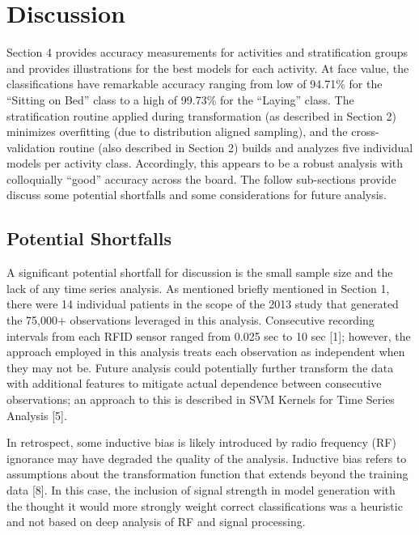 \documentclass[
]{article}
\begin{document}
\newpage

\section{Discussion}\label{discussion}

Section 4 provides accuracy measurements for activities and
stratification groups and provides illustrations for the best models for
each activity. At face value, the classifications have remarkable
accuracy ranging from low of 94.71\% for the ``Sitting on Bed'' class to
a high of 99.73\% for the ``Laying'' class. The stratification routine
applied during transformation (as described in Section 2) minimizes
overfitting (due to distribution aligned sampling), and the
cross-validation routine (also described in Section 2) builds and
analyzes five individual models per activity class. Accordingly, this
appears to be a robust analysis with colloquially ``good'' accuracy
across the board. The follow sub-sections provide discuss some potential
shortfalls and some considerations for future analysis.

\subsection{Potential Shortfalls}\label{potential-shortfalls}

A significant potential shortfall for discussion is the small sample
size and the lack of any time series analysis. As mentioned briefly
mentioned in Section 1, there were 14 individual patients in the scope
of the 2013 study that generated the 75,000+ observations leveraged in
this analysis. Consecutive recording intervals from each RFID sensor
ranged from 0.025 sec to 10 sec {[}1{]}; however, the approach employed
in this analysis treats each observation as independent when they may
not be. Future analysis could potentially further transform the data
with additional features to mitigate actual dependence between
consecutive observations; an approach to this is described in SVM
Kernels for Time Series Analysis {[}5{]}.

In retrospect, some inductive bias is likely introduced by radio
frequency (RF) ignorance may have degraded the quality of the analysis.
Inductive bias refers to assumptions about the transformation function
that extends beyond the training data {[}8{]}. In this case, the
inclusion of signal strength in model generation with the thought it
would more strongly weight correct classifications was a heuristic and
not based on deep analysis of RF and signal processing.
\end{document}
